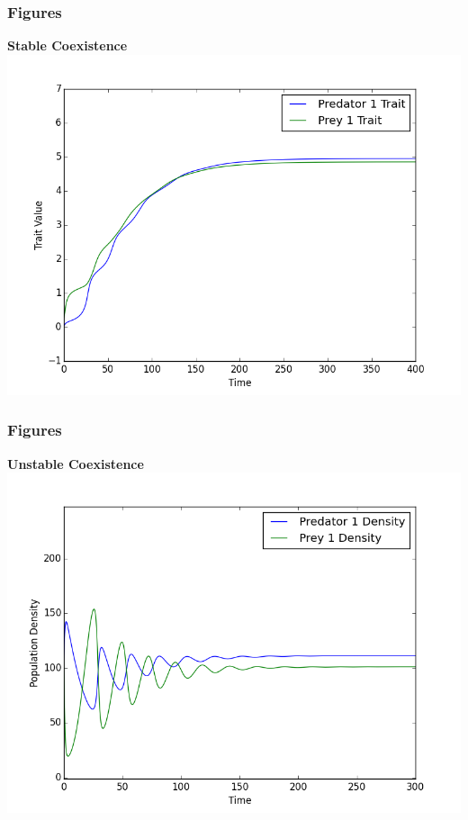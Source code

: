 \documentclass[10pt]{beamer}
\begin{document}
\begin{frame}
	\frametitle{Figures}
	{\bf Stable Coexistence}
	\includegraphics[scale=0.5]{figures/1x1/traits_stable_coexistence.png}
\end{frame}
\begin{frame}
	\frametitle{Figures}
	{\bf Unstable Coexistence}
	\includegraphics[scale=0.5]{figures/1x1/densities_unstable_coexistence.png}
\end{frame}
\end{document}

